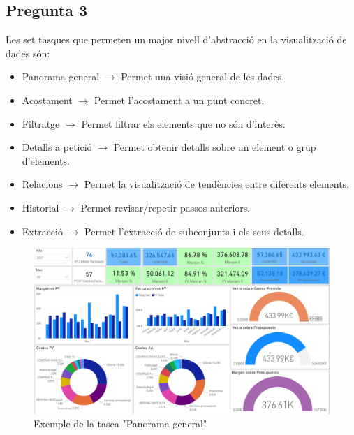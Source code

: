 \documentclass[a4paper,12pt]{report}
\begin{document}
\subsection*{Pregunta 3}
Les set tasques que permeten un major nivell d'abstracció en la visualització de dades són:
\begin{itemize}
    \item Panorama general $\rightarrow$ Permet una visió general de les dades.
    \item Acostament $\rightarrow$ Permet l'acostament a un punt concret.
    \item Filtratge $\rightarrow$ Permet filtrar els elements que no són d'interès.
    \item Detalls a petició $\rightarrow$ Permet obtenir detalls sobre un element o grup d'elements.
    \item Relacions $\rightarrow$ Permet la visualització de tendències entre diferents elements.
    \item Historial $\rightarrow$ Permet revisar/repetir passos anteriors.
    \item Extracció $\rightarrow$ Permet l'extracció de subconjunts i els seus detalls.
\end{itemize}
\begin{figure}[H]
    \centering
    \includegraphics[scale = 0.2]{images/dashboard_ventas.png}
    \caption{Exemple de la tasca "Panorama general"}
    \label{fig:panorama_general}
\end{figure}
\end{document}

